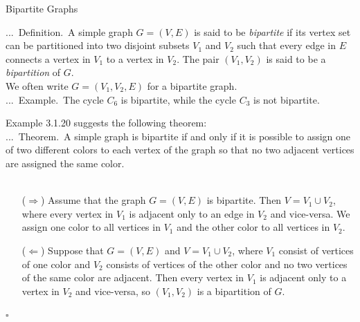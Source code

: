 \documentclass[smaller,hyperref={CJKbookmarks=true}]{beamer}
\newenvironment{PROOF}{{\noindent\!\sf\alert{Proof.}}\\}{\hfill$\square$\\}
\newcounter{zhuo}[subsection]
\renewcommand{\thezhuo}{\thesection.\thesubsection.\arabic{zhuo}}
\newenvironment{DEFINITION}{\stepcounter{zhuo}\alert{\thezhuo.~Definition.\,}}{}
\newenvironment{EXAMPLE}{\stepcounter{zhuo}\alert{\!\thezhuo.~Example.\,}}{}
\newenvironment{THEOREM}{\stepcounter{zhuo}\alert{\thezhuo.~Theorem.\,}}{}
\begin{document}
\begin{frame}{Bipartite Graphs}
\begin{spacing}{1.05}
\begin{DEFINITION}
A simple graph $G=(V,E)$ is said to be \emph{bipartite} if its vertex set can be partitioned into two disjoint subsets $V_1$ and $V_2$ such that every edge in $E$ connects a vertex in $V_1$ to a vertex in $V_2$. The pair $(V_1,V_2)$ is said to be a \emph{bipartition} of $G$.\\[5pt]
We often write $G=(V_1,V_2,E)$ for a bipartite graph.\\[6pt]
\begin{EXAMPLE}
The cycle $C_6$ is bipartite, while the cycle $C_3$ is not bipartite.\\[5pt]
\begin{center}
\end{center}
\end{EXAMPLE}
\end{DEFINITION}
\newpage
Example 3.1.20 suggests the following theorem:\\[5pt]
\begin{THEOREM}
A simple graph is bipartite if and only if it is possible to
assign one of two different colors to each vertex of the graph so that no
two adjacent vertices are assigned the same color.\\[5pt]
\end{THEOREM}
\begin{PROOF}
\begin{itemize}
  \item[($\Rightarrow$)] Assume that the graph $G=(V,E)$ is bipartite. Then $V=V_1\cup V_2$, where every vertex in $V_1$ is adjacent only to an edge in $V_2$ and vice-versa. We assign one color to all vertices in $V_1$ and the other color to all vertices in $V_2$.
  \item[($\Leftarrow$)] Suppose that $G=(V,E)$ and $V=V_1\cup V_2$, where $V_1$ consist of vertices of one color and $V_2$ consists of vertices of the other color and no two vertices of the same color are adjacent. Then every vertex in $V_1$ is adjacent only to a vertex in $V_2$ and vice-versa, so $(V_1,V_2)$ is a bipartition of $G$.
\end{itemize}
\end{PROOF}
\end{spacing}
\end{frame}
\end{document}
